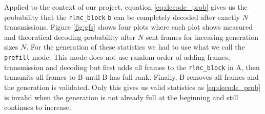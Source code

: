 \documentclass[a4paper,english,10pt]{tumarticle}
\begin{document}
Applied to the context of our project, equation \eqref{eq:decode_prob} gives us
the probability that the \texttt{rlnc\_block} \texttt{b} can be completely
decoded after exactly $N$ transmissions. Figure \ref{fig:gfs} shows four plots
where each plot shows measured and theoratical decoding probability after $N$
sent frames for inceasing generation sizes $N$. For the generation of these
statistics we had to use what we call the \texttt{prefill} mode. This mode does
not use random order of adding frames, transmission and decoding but first adds
all frames to the \texttt{rlnc\_block} in A, then transmits all frames to B
until B has full rank. Finally, B removes all frames and the generation is
validated. Only this gives us valid statistics as \eqref{eq:decode_prob} is
invalid when the generation is not already full at the beginning and still
continues to increase.

\end{document}
